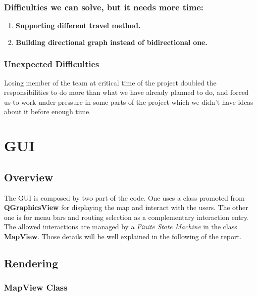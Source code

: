 \documentclass[a4paper, 12pt, english]{book}
\begin{document}
\subsubsection{Difficulties we can solve, but it needs more time:}
\begin{enumerate}
	\item {\textbf{Supporting different travel method.}}
	\item {\textbf{Building directional graph instead of bidirectional one.}}
\end{enumerate}
\subsubsection{Unexpected Difficulties}
Losing member of the team at critical time of the project doubled the responsibilities to do more than what we have already planned to do, and forced us to work under pressure in some parts of the project which we didn't have ideas about it before enough time.
\section{GUI}

\subsection{Overview}

The GUI is composed by two part of the code. One uses a class promoted from {\textbf{QGraphicsView}} for displaying the map and interact with the users. The other one is for menu bars and routing selection as a complementary interaction entry. The allowed interactions are managed by a {\textit{Finite State Machine}} in the class {\textbf{MapView}}. Those details will be well explained in the following of the report.

\subsection{Rendering}

\subsubsection{MapView Class}
\end{document}
